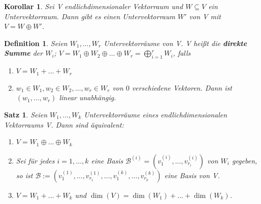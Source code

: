\documentclass[12pt,a4paper]{article}
\theoremstyle{plain}
\newtheorem{Satz}[Theorem]{Satz}
\newtheorem{Korollar}[Theorem]{Korollar}
\newtheorem{Definition}[Theorem]{Definition}
\newcommand{\herv}[1]{{\emph{\textbf{#1}}}}
\numberwithin{equation}{section}
\begin{document}
\begin{Korollar}
Sei V endlichdimensionaler Vektorraum und $W\subseteq V$ ein Untervektorraum. Dann gibt es einen Untervektorraum $W'$ von V mit $V=W\oplus W'$.
\end{Korollar}
\begin{Definition}
Seien $W_1,\ldots,W_r$ Untervektorräume von V. V heißt die \herv{direkte Summe} der $W_i$; $V=W_1\oplus W_2\oplus \ldots \oplus W_r = \bigoplus _{i=1}^r{W_i}$, falls \begin{enumerate}
\renewcommand{\labelenumi}{\emph{\underline{DS\arabic{enumi}}}}
\item $V=W_1+\ldots+W_r$
\item $w_1\in W_1, w_2\in W_2,\ldots,w_r\in W_r$ von $0$ verschiedene Vektoren. Dann ist $(w_1,\ldots,w_r)$ linear unabhängig.
\end{enumerate}
\end{Definition}
\begin{Satz}
Seien $W_1,\ldots,W_k$ Untervektorräume eines endlichdimensionalen Vektorraums V. Dann sind äquivalent:
\begin{enumerate}
\renewcommand{\labelenumi}{\emph{(\roman{enumi})}}
\item $V=W_1\oplus \ldots \oplus W_k$
\item Sei für jedes $i=1,\ldots,k$ eine Basis $\mathcal{B}^{(i)}=(v_1^{(i)},\ldots,v_{r_i}^{(i)})$ von $W_i$ gegeben, so ist $\mathcal{B}:=(v_1^{(1)},\ldots,v_{r_1}^{(1)},\ldots,v_1^{(k)},\ldots,v_{r_k}^{(k)})$ eine Basis von V.
\item $V=W_1+\ldots+W_k$ und $\dim(V)=\dim(W_1)+\ldots+\dim(W_k)$.
\end{enumerate}
\end{Satz}
\end{document}
